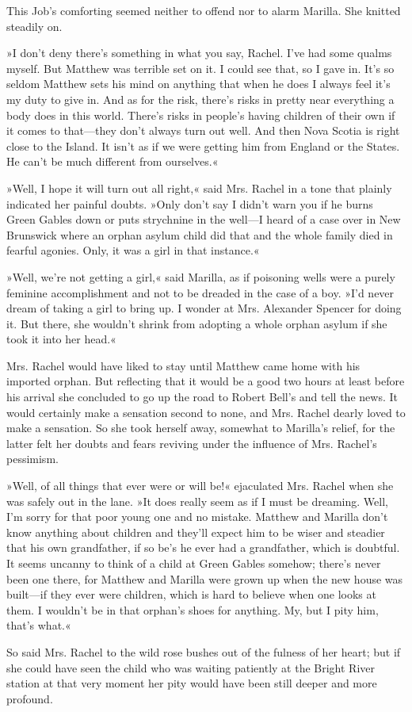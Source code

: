 This Job's comforting seemed neither to offend nor to alarm Marilla. She knitted steadily on.

»I don't deny there's something in what you say, Rachel. I've had some qualms myself. But Matthew was terrible set on it. I could see that, so I gave in. It's so seldom Matthew sets his mind on anything that when he does I always feel it's my duty to give in. And as for the risk, there's risks in pretty near everything a body does in this world. There's risks in people's having children of their own if it comes to that—they don't always turn out well. And then Nova Scotia is right close to the Island. It isn't as if we were getting him from England or the States. He can't be much different from ourselves.«

»Well, I hope it will turn out all right,« said Mrs. Rachel in a tone that plainly indicated her painful doubts. »Only don't say I didn't warn you if he burns Green Gables down or puts strychnine in the well—I heard of a case over in New Brunswick where an orphan asylum child did that and the whole family died in fearful agonies. Only, it was a girl in that instance.«

»Well, we're not getting a girl,« said Marilla, as if poisoning wells were a purely feminine accomplishment and not to be dreaded in the case of a boy. »I'd never dream of taking a girl to bring up. I wonder at Mrs. Alexander Spencer for doing it. But there, she wouldn't shrink from adopting a whole orphan asylum if she took it into her head.«

Mrs. Rachel would have liked to stay until Matthew came home with his imported orphan. But reflecting that it would be a good two hours at least before his arrival she concluded to go up the road to Robert Bell's and tell the news. It would certainly make a sensation second to none, and Mrs. Rachel dearly loved to make a sensation. So she took herself away, somewhat to Marilla's relief, for the latter felt her doubts and fears reviving under the influence of Mrs. Rachel's pessimism.

»Well, of all things that ever were or will be!« ejaculated Mrs. Rachel when she was safely out in the lane. »It does really seem as if I must be dreaming. Well, I'm sorry for that poor young one and no mistake. Matthew and Marilla don't know anything about children and they'll expect him to be wiser and steadier that his own grandfather, if so be's he ever had a grandfather, which is doubtful. It seems uncanny to think of a child at Green Gables somehow; there's never been one there, for Matthew and Marilla were grown up when the new house was built—if they ever were children, which is hard to believe when one looks at them. I wouldn't be in that orphan's shoes for anything. My, but I pity him, that's what.«

So said Mrs. Rachel to the wild rose bushes out of the fulness of her heart; but if she could have seen the child who was waiting patiently at the Bright River station at that very moment her pity would have been still deeper and more profound.
